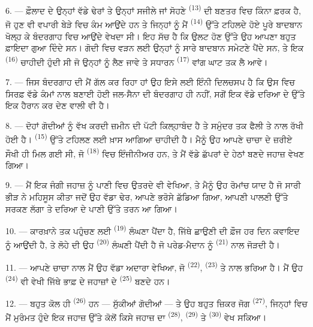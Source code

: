 6. --- ਫ਼ੌਲਾਦ ਦੇ ਉਨ੍ਹਾਂ ਵੱਡੇ ਢੇਰਾਂ ਤੇ ਉਨ੍ਹਾਂ ਸਜੀਲੇ  ਜਾਂ
ਸੋਹਣੇ  \textsuperscript{(13)} ਦੀ ਬਣਤਰ ਵਿਚ ਕਿੰਨਾ ਫ਼ਰਕ ਹੈ, ਜੋ
ਹੁਣ ਵੀ ਵਪਾਰੀ ਬੇੜੇ ਵਿਚ ਕੰਮ ਆਉਂਦੇ ਹਨ ਤੇ ਜਿਨ੍ਹਾਂ ਨੂੰ ਮੈਂ 
\textsuperscript{(14)} ਉੱਤੇ ਟਹਿਲਦੇ ਹੋਏ ਪੂਰੇ ਬਾਦਬਾਨ ਖੋਲ੍ਹ ਕੇ ਬੰਦਰਗਾਹ ਵਿਚ ਆਉਂਦੇ
ਵੇਖਦਾ ਸੀ। ਇਹ ਸੱਚ ਹੈ ਕਿ  ਉਲਟ ਹੋਣ ਉੱਤੇ ਉਹ ਆਪਣਾ ਬਹੁਤ ਫ਼ਾਇਦਾ ਗੁਆ ਦਿੰਦੇ
ਸਨ। ਗੋਦੀ ਵਿਚ ਵੜਨ ਲਈ ਉਨ੍ਹਾਂ ਨੂੰ ਸਾਰੇ ਬਾਦਬਾਨ ਸਮੇਟਣੇ ਪੈਂਦੇ ਸਨ, ਤੇ ਇਕ
 \textsuperscript{(16)} ਚਾਹੀਦੀ ਹੁੰਦੀ ਸੀ ਜੋ ਉਨ੍ਹਾਂ ਨੂੰ ਲੈਣ
ਜਾਵੇ ਤੇ ਸਧਾਰਨ  \textsuperscript{(17)} ਵਾਂਗ ਘਾਟ ਤਕ ਲੈ
ਆਵੇ।

\VUsaut{3.0mm}
\VUsaut{3.0mm}

7. --- ਜਿਸ ਬੰਦਰਗਾਹ ਦੀ ਮੈਂ ਗੱਲ ਕਰ ਰਿਹਾ ਹਾਂ ਉਹ ਇਸੇ ਲਈ ਇੰਨੀ ਦਿਲਚਸਪ ਹੈ ਕਿ ਉਸ ਵਿਚ
ਸਿਰਫ਼ ਵੱਡੇ ਕੰਮਾਂ ਨਾਲ ਬਣਾਈ ਹੋਈ ਜਲ-ਸੈਨਾ ਦੀ ਬੰਦਰਗਾਹ ਹੀ ਨਹੀਂ, ਸਗੋਂ ਇਕ ਵੱਡੇ ਦਰਿਆ ਦੇ
 ਉੱਤੇ ਇਕ ਹੈਰਾਨ ਕਰ ਦੇਣ ਵਾਲੀ  ਵੀ ਹੈ।

8. --- ਦੋਹਾਂ ਗੋਦੀਆਂ ਨੂੰ ਵੱਖ ਕਰਦੀ ਜ਼ਮੀਨ ਦੀ ਪੱਟੀ ਕਿਲ੍ਹਾਬੰਦ ਹੈ ਤੇ ਸਮੁੰਦਰ ਤਕ ਫੈਲੀ
 ਤੇ  ਨਾਲ ਰੱਖੀ ਹੋਈ ਹੈ। 
\textsuperscript{(15)} ਉੱਤੇ ਟਹਿਲਣ ਲਈ ਖ਼ਾਸ ਆਗਿਆ ਚਾਹੀਦੀ ਹੈ। ਮੈਨੂੰ ਉਹ ਆਪਣੇ ਚਾਚਾ ਦੇ
ਜ਼ਰੀਏ ਸੌਖੀ ਹੀ ਮਿਲ ਗਈ ਸੀ, ਜੋ  \textsuperscript{(18)}
ਵਿਚ ਇੰਜੀਨੀਅਰ ਹਨ, ਤੇ ਮੈਂ ਵੱਡੇ ਛੱਪਰਾਂ ਦੇ ਹੇਠਾਂ ਬਣਦੇ ਜਹਾਜ਼ ਵੇਖਣ ਗਿਆ।

9. --- ਮੈਂ ਇਕ ਜੰਗੀ ਜਹਾਜ਼ ਨੂੰ ਪਾਣੀ ਵਿਚ ਉਤਰਦੇ ਵੀ ਵੇਖਿਆ, ਤੇ ਮੈਨੂੰ ਉਹ ਰੋਮਾਂਚ ਯਾਦ ਹੈ
ਜੋ ਸਾਰੀ ਭੀੜ ਨੇ ਮਹਿਸੂਸ ਕੀਤਾ ਜਦੋਂ ਉਹ ਵੱਡਾ ਢੇਰ, ਆਪਣੇ ਭਰੋਸੇ ਛੱਡਿਆ ਗਿਆ, ਆਪਣੀ ਪਾਲਣੀ
ਉੱਤੇ ਸਰਕਣ ਲੱਗਾ ਤੇ ਦਰਿਆ ਦੇ ਪਾਣੀ ਉੱਤੇ ਤਰਨ ਆ ਗਿਆ।

10. --- ਕਾਰਖ਼ਾਨੇ ਤਕ ਪਹੁੰਚਣ ਲਈ  \textsuperscript{(19)} ਲੰਘਣਾ
ਪੈਂਦਾ ਹੈ, ਜਿੱਥੇ ਛਾਉਣੀ ਦੀ ਫ਼ੌਜ ਹਰ ਦਿਨ ਕਵਾਇਦ ਨੂੰ ਆਉਂਦੀ ਹੈ, ਤੇ ਲੋਹੇ ਦੀ ਉਹ
 \textsuperscript{(20)} ਲੰਘਣੀ ਪੈਂਦੀ ਹੈ ਜੋ ਪਰੇਡ-ਮੈਦਾਨ ਨੂੰ
 \textsuperscript{(21)} ਨਾਲ ਜੋੜਦੀ ਹੈ।

\VUsaut{3.0mm}
\VUsaut{3.0mm}

11. --- ਆਪਣੇ ਚਾਚਾ ਨਾਲ ਮੈਂ ਉਹ ਵੱਡਾ ਅਦਾਰਾ ਵੇਖਿਆ, ਜੋ 
\textsuperscript{(22)},  \textsuperscript{(23)} ਤੇ  ਨਾਲ
ਭਰਿਆ ਹੈ। ਮੈਂ ਉਹ  \textsuperscript{(24)} ਵੀ ਵੇਖੀ ਜਿੱਥੇ ਭਾਫ਼ ਦੇ
ਜਹਾਜ਼ਾਂ ਦੇ  \textsuperscript{(25)} ਬਣਦੇ ਹਨ।

12. --- ਬਹੁਤ ਕੋਲ ਹੀ  \textsuperscript{(26)} ਹਨ — ਸੁੱਕੀਆਂ ਗੋਦੀਆਂ —
ਤੇ ਉਹ ਬਹੁਤ ਜ਼ਿਕਰ ਜੋਗ  \textsuperscript{(27)}, ਜਿਨ੍ਹਾਂ ਵਿਚ ਮੈਂ
ਮੁਰੰਮਤ ਹੁੰਦੇ ਇਕ ਜਹਾਜ਼ ਉੱਤੇ ਕੋਲੋਂ ਕਿਸੇ ਜਹਾਜ਼ ਦਾ  \textsuperscript{(28)},
 \textsuperscript{(29)} ਤੇ  \textsuperscript{(30)} ਵੇਖ
ਸਕਿਆ।

